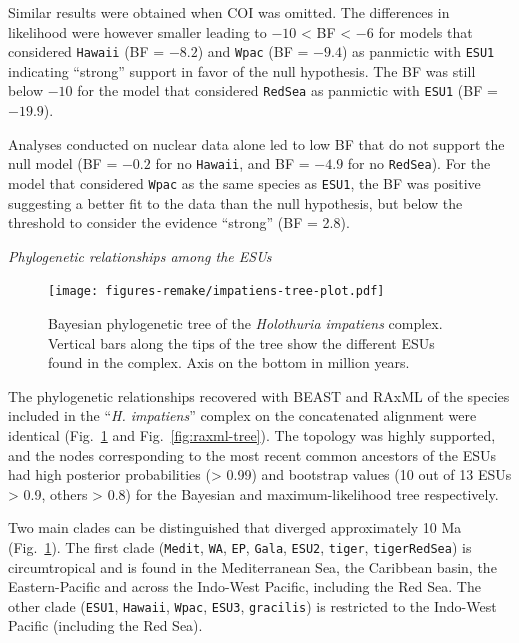 \documentclass[12pt,letterpaper]{article}\usepackage[]{graphicx}\usepackage[]{color}
\renewcommand{\subsection}[1]{%
\bigskip
\begin{center}
\begin{large}
\normalfont\itshape #1
\end{large}
\end{center}}
\begin{document}

Similar results were obtained when COI was omitted. The differences in
likelihood were however smaller leading to $-10$ < BF < $-6$ for models that
considered \texttt{Hawaii} (BF = \ensuremath{-8.2}) and \texttt{Wpac} (BF =
\ensuremath{-9.4}) as panmictic with \texttt{ESU1} indicating ``strong''
support in favor of the null hypothesis. The BF was still below $-10$ for the
model that considered \texttt{RedSea} as panmictic with \texttt{ESU1} (BF =
\ensuremath{-19.9}).

Analyses conducted on nuclear data alone led to low BF that do not support the
null model (BF = \ensuremath{-0.2} for no \texttt{Hawaii}, and BF =
\ensuremath{-4.9} for no \texttt{RedSea}). For the model that considered
\texttt{Wpac} as the same species as \texttt{ESU1}, the BF was positive
suggesting a better fit to the data than the null hypothesis, but below the
threshold to consider the evidence ``strong'' (BF = 2.8).


\subsection{Phylogenetic relationships among the ESUs}

\begin{figure}
  {\centering \texttt{[image: figures-remake/impatiens-tree-plot.pdf]}}

  \caption{Bayesian phylogenetic tree of the \textit{Holothuria impatiens}
    complex. Vertical bars along the tips of the tree show the different ESUs
    found in the complex. Axis on the bottom in million
    years.}\label{fig:impatiens-tree}
\end{figure}


The phylogenetic relationships recovered with BEAST and RAxML of the species
included in the ``\textit{H. impatiens}'' complex on the concatenated alignment
were identical (Fig.~\ref{fig:impatiens-tree} and
Fig.~\ref{fig:raxml-tree}). The topology was highly supported, and the nodes
corresponding to the most recent common ancestors of the ESUs had high posterior
probabilities (> 0.99) and bootstrap values (10 out of 13 ESUs > 0.9, others >
0.8) for the Bayesian and maximum-likelihood tree respectively.

Two main clades can be distinguished that diverged approximately 10 Ma
(Fig.~\ref{fig:impatiens-tree}). The first clade (\texttt{Medit}, \texttt{WA},
\texttt{EP}, \texttt{Gala}, \texttt{ESU2}, \texttt{tiger}, \texttt{tigerRedSea})
is circumtropical and is found in the Mediterranean Sea, the Caribbean basin,
the Eastern-Pacific and across the Indo-West Pacific, including the Red Sea. The
other clade (\texttt{ESU1}, \texttt{Hawaii}, \texttt{Wpac}, \texttt{ESU3},
\texttt{gracilis}) is restricted to the Indo-West Pacific (including the Red
Sea).
\end{document}
